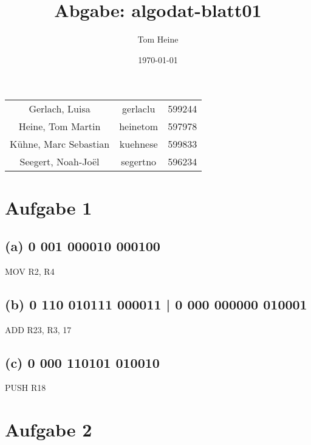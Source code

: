 \documentclass[12pt,a4paper]{scrartcl}
\author{Tom Heine}
\title{Abgabe: algodat-blatt01}
\date{\today}
\begin{document}
	\newpage
	\begin{center}
		\begin{tabular}{ccc}
			Gerlach, Luisa&gerlaclu&599244\\
			Heine, Tom Martin&heinetom&597978\\
			Kühne, Marc Sebastian&kuehnese&599833\\
			Seegert, Noah-Joël&segertno&596234
		\end{tabular}
	\end{center}
	\section*{Aufgabe 1}
	\subsection*{(a) 0 001 000010 000100}
	MOV R2, R4
	\subsection*{(b) 0 110 010111 000011 |
		0 000 000000 010001}
	ADD R23, R3, 17
	\subsection*{(c) 0 000 110101 010010}
	PUSH R18
	\newpage
	\section*{Aufgabe 2}
	
\end{document}
